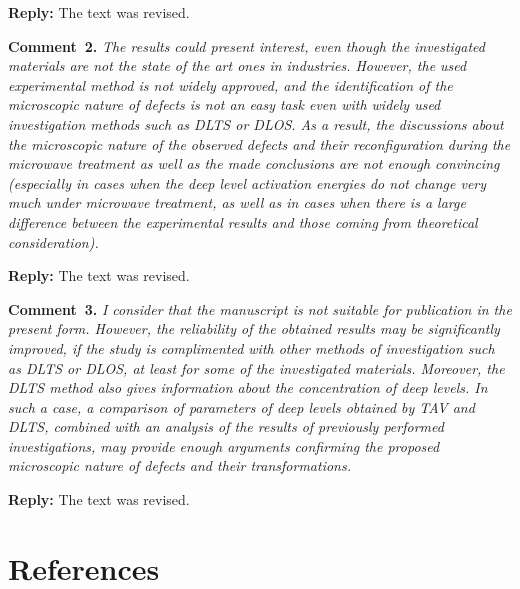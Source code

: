 \documentclass[10pt]{iopart}
\begin{document}
\noindent
\textcolor[rgb]{0.51,0.00,0.00}{\textbf{Reply:}}
The text was revised.


\vspace{1cm}
\noindent
\textcolor[rgb]{0.00,0.50,1.00}{\textbf{Comment~2.}}
\emph{The results could present interest, even though the investigated materials are not the state of the art ones in industries.
However, the used experimental method is not widely approved,
and the identification of the microscopic nature of defects is not an easy
task even with widely used investigation methods such as DLTS or DLOS.
As a result, the discussions about the microscopic nature of the observed defects
and their reconfiguration during the microwave treatment
as well as the made conclusions are not enough convincing
(especially in cases when the deep level activation
energies do not change very much under microwave treatment,
as well as in cases when there is a large difference
between the experimental results and those coming from theoretical consideration).}

\noindent
\textcolor[rgb]{0.51,0.00,0.00}{\textbf{Reply:}}
The text was revised.

\vspace{1cm}
\noindent
\textcolor[rgb]{0.00,0.50,1.00}{\textbf{Comment~3.}}
\emph{I consider that the manuscript is not suitable for publication in the present form.
However, the reliability of the obtained results may be significantly improved,
if the study is complimented with other methods of investigation such as DLTS or DLOS,
at least for some of the investigated materials.
Moreover, the DLTS method also gives information about the concentration of deep levels.
In such a case, a comparison of parameters of deep levels obtained by TAV and DLTS,
combined with an analysis of the results of previously performed investigations,
may provide enough arguments confirming the
proposed microscopic nature of defects and their transformations.}

\noindent
\textcolor[rgb]{0.51,0.00,0.00}{\textbf{Reply:}}
The text was revised.


\section*{References}



\end{document}

